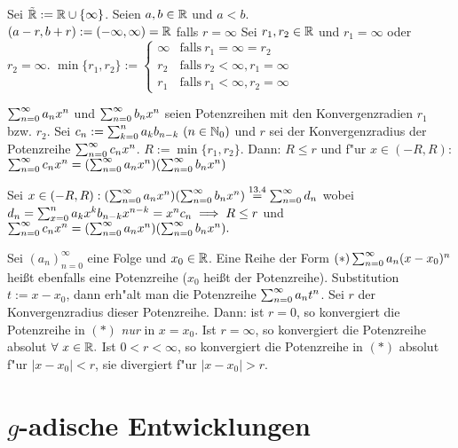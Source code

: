 \documentclass[a4paper,twoside,DIV15,BCOR12mm]{scrbook}
\begin{document}
\begin{vereinbarung}
Sei $\tilde {\mathbb{R}}:=\mathbb{R} \cup \{\infty\}$. Seien $a, b \in\mathbb{R}$ und $a<b$.\\
$(a-r, b+r) := (-\infty, \infty) = \mathbb{R}$ falls $r=\infty$
Sei $r_1, r_2 \in\mathbb{R}$ und $r_1=\infty$ oder $r_2=\infty$.
$\min\{r_1, r_2\} := \begin{cases}
\infty & \text{falls}\ r_1=\infty=r_2\\
r_2 & \text{falls}\ r_2<\infty, r_1=\infty \\
r_1 & \text{falls}\ r_1<\infty, r_2=\infty
\end{cases}$
\end{vereinbarung}

\begin{satz}
$\sum_{n=0}^{\infty}{a_nx^n}$ und $\sum_{n=0}^{\infty}{b_nx^n}$ seien Potenzreihen mit den Konvergenzradien $r_1$ bzw. $r_2$. Sei $c_n:=\sum_{k=0}^{n}{a_kb_{n-k}}\ (n\in\MdN_0)$ und $r$ sei der Konvergenzradius der Potenzreihe $\sum_{n=0}^{\infty}{c_nx^n}$. $R:=\min\{r_1, r_2\}$. Dann: $R\le r$ und f"ur $x \in (-R, R):$ $\sum_{n=0}^{\infty}{c_nx^n}=(\sum_{n=0}^{\infty}{a_nx^n})(\sum_{n=0}^{\infty}{b_nx^n})$
\end{satz}

\begin{beweis}
Sei $x \in (-R, R): (\sum_{n=0}^{\infty}{a_nx^n})(\sum_{n=0}^{\infty}{b_nx^n})\overset{\text{13.4}}{=}\sum_{n=0}^{\infty}{d_n}$ wobei \\$d_n = \sum^{n}_{x=0}{a_kx^kb_{n-k}x^{n-k}} = x^nc_n \implies R\le r$ und \\$\sum_{n=0}^{\infty}{c_nx^n}=(\sum_{n=0}^{\infty}{a_nx^n})(\sum_{n=0}^{\infty}{b_nx^n}).$
\end{beweis}

\begin{bemerkung}
Sei $(a_n)^{\infty}_{n=0}$ eine Folge und $x_0 \in\mathbb{R}$. Eine Reihe der Form $(*) \sum_{n=0}^{\infty}{a_n(x-x_0)^n}$ heißt ebenfalls eine Potenzreihe ($x_0$ heißt  der Potenzreihe). Substitution $t:=x-x_0$, dann erh"alt man die Potenzreihe $\sum_{n=0}^{\infty}{a_nt^n}$. Sei $r$ der Konvergenzradius dieser Potenzreihe. Dann: ist $r=0$, so konvergiert die Potenzreihe in $(*)$ \emph{nur} in $x=x_0$. Ist $r=\infty$, so konvergiert die Potenzreihe absolut $\forall\ x\in\mathbb{R}.$ Ist $0<r<\infty$, so konvergiert die Potenzreihe in $(*)$ absolut f"ur $|x-x_0|<r$, sie divergiert f"ur $|x-x_0|>r.$ 
\end{bemerkung}

\chapter{$g$-adische Entwicklungen}
\end{document}
